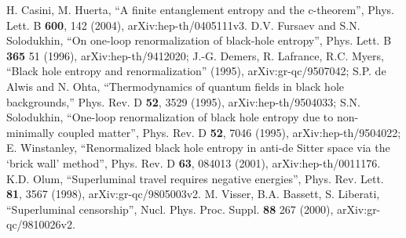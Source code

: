 \documentclass{article}
\begin{document}
\begin{thebibliography}{99}
H. Casini, M. Huerta, ``A finite entanglement entropy and the c-theorem'', Phys. Lett. B \textbf{600}, 142 (2004), arXiv:hep-th/0405111v3.
D.V. Fursaev and S.N. Solodukhin, ``On one-loop renormalization of black-hole entropy'', Phys. Lett. B \textbf{365} 51 (1996), arXiv:hep-th/9412020; J.-G. Demers, R. Lafrance, R.C. Myers, ``Black hole entropy and renormalization'' (1995), arXiv:gr-qc/9507042; S.P. de Alwis and N. Ohta, ``Thermodynamics of quantum fields in black hole backgrounds,'' Phys. Rev. D \textbf{52}, 3529 (1995), arXiv:hep-th/9504033; S.N. Solodukhin, ``One-loop renormalization of black hole entropy due to non-minimally coupled matter'', Phys. Rev. D \textbf{52}, 7046 (1995), arXiv:hep-th/9504022;  E. Winstanley, ``Renormalized black hole entropy in anti-de Sitter space via the `brick wall' method'', Phys. Rev. D \textbf{63}, 084013 (2001), arXiv:hep-th/0011176.
K.D. Olum, ``Superluminal travel requires negative energies'', Phys. Rev. Lett. \textbf{81}, 3567 (1998), arXiv:gr-qc/9805003v2.
M. Visser, B.A. Bassett, S. Liberati, ``Superluminal censorship'', Nucl. Phys. Proc. Suppl. \textbf{88} 267 (2000), arXiv:gr-qc/9810026v2.

\end{thebibliography}
\end{document}
